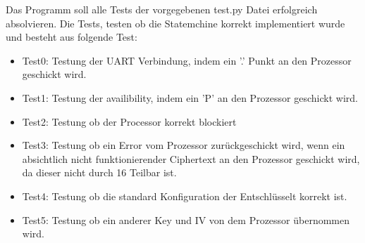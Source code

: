 \newpage
    \noindent Das Programm soll alle Tests der vorgegebenen test.py Datei erfolgreich absolvieren. 
    Die Tests, testen ob die Statemchine korrekt implementiert wurde und besteht aus folgende Test: 
    \begin{itemize}
        \setlength\itemsep{0em}
        \item Test0: Testung der UART Verbindung, indem ein '.' Punkt an den Prozessor geschickt wird. 
        \item Test1: Testung der availibility, indem ein 'P' an den Prozessor geschickt wird. 
        \item Test2: Testung ob der Processor korrekt blockiert 
        \item Test3: Testung ob ein Error vom Prozessor zurückgeschickt wird, wenn ein absichtlich nicht funktionierender Ciphertext an den Prozessor geschickt wird, da dieser nicht durch 16 Teilbar ist. 
        \item Test4: Testung ob die standard Konfiguration der Entschlüsselt korrekt ist. 
        \item Test5: Testung ob ein anderer Key und IV von dem Prozessor übernommen wird. 
    \end{itemize}
    
